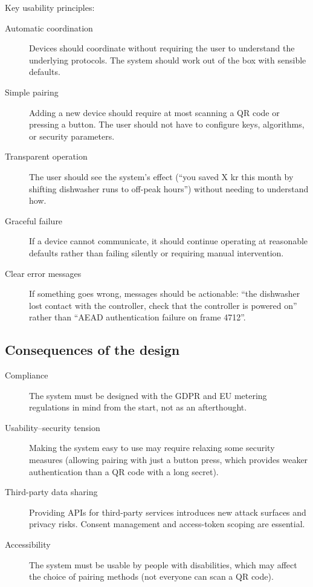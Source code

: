 Key usability principles:
\begin{description}
  \item[Automatic coordination] Devices should coordinate without
    requiring the user to understand the underlying protocols.
    The system should work out of the box with sensible defaults.
  \item[Simple pairing] Adding a new device should require at most scanning
    a QR code or pressing a button.
    The user should not have to configure keys, algorithms, or
    security parameters.
  \item[Transparent operation] The user should see the system's effect
    (\enquote{you saved X kr this month by shifting dishwasher runs to
    off-peak hours}) without needing to understand how.
  \item[Graceful failure] If a device cannot communicate, it should
    continue operating at reasonable defaults rather than failing silently
    or requiring manual intervention.
  \item[Clear error messages] If something goes wrong, messages should be
    actionable: \enquote{the dishwasher lost contact with the controller,
    check that the controller is powered on} rather than
    \enquote{AEAD authentication failure on frame 4712}.
\end{description}

\subsection{Consequences of the design}

\begin{description}
  \item[Compliance] The system must be designed with the \ac{GDPR} and EU
    metering regulations in mind from the start, not as an afterthought.
  \item[Usability--security tension] Making the system easy to use may
    require relaxing some security measures (\eg allowing pairing with
    just a button press, which provides weaker authentication than a
    QR code with a long secret).
  \item[Third-party data sharing] Providing APIs for third-party services
    introduces new attack surfaces and privacy risks.
    Consent management and access-token scoping are essential.
  \item[Accessibility] The system must be usable by people with
    disabilities, which may affect the choice of pairing methods
    (not everyone can scan a QR code).
\end{description}


